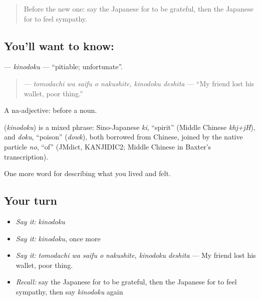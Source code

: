 \begin{quote}
Before the new one: say the Japanese for to be grateful, then the Japanese for to feel sympathy.
\end{quote}

\subsection*{You'll want to know: }
\textbf{} — \emph{kinodoku} — \textquotedblleft{}pitiable; unfortunate\textquotedblright{}.

\begin{quote}
\textbf{  } — \emph{tomodachi wa saifu o nakushite, kinodoku deshita} — \textquotedblleft{}My friend lost his wallet, poor thing.\textquotedblright{}
\end{quote}

A na-adjective:  before a noun.

\begin{cousinweb}
\textbf{} (\emph{kinodoku}) is a mixed phrase: Sino-Japanese \emph{ki}, \textquotedblleft{}spirit\textquotedblright{} (Middle Chinese \emph{khj+jH}), and \emph{doku}, \textquotedblleft{}poison\textquotedblright{} (\emph{dowk}), both borrowed from Chinese, joined by the native particle \emph{no}, \textquotedblleft{}of\textquotedblright{} (JMdict, KANJIDIC2; Middle Chinese in Baxter's transcription).
\end{cousinweb}

\begin{grammarlens}[title={What you've built}]
One more word for describing what you lived and felt.
\end{grammarlens}

\subsection*{Your turn}
\begin{itemize}
\raggedright
  \item \emph{Say it:} \emph{kinodoku}
  \item \emph{Say it:} \emph{kinodoku}, once more
  \item \emph{Say it:} \emph{tomodachi wa saifu o nakushite, kinodoku deshita} — My friend lost his wallet, poor thing.
  \item \emph{Recall:} say the Japanese for to be grateful, then the Japanese for to feel sympathy, then say \emph{kinodoku} again
\end{itemize}

